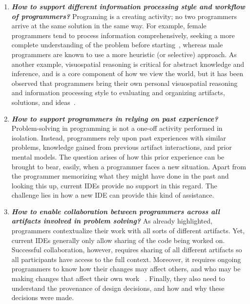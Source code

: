 \begin{enumerate}
 	\item \textit{\textbf{How to support different information processing style and workflow of programmers?}}
 	Programing is a creating activity; no two programmers arrive at the same solution in the same way. For example, female programmers tend to process information comprehensively, seeking a more complete understanding of the problem before starting~\cite{grigoreanu2012end}, whereas male programmers are known to use a more heuristic (or selective) approach. As another example, visuospatial reasoning is critical for abstract knowledge and inference, and is a core component of how we view the world, but it has been observed that programmers bring their own personal visuospatial reasoning and information processing style to evaluating and organizing artifacts, solutions, and ideas~\cite{tversky2005visuospatial}.
  
  \item \textit{\textbf{How to support programmers in relying on past experience?}}
  Problem-solving in programming is not a one-off activity performed in isolation.
  Instead, programmers rely upon past experiences with similar problems, knowledge gained from previous artifact interactions, and prior mental models. %
  The question arises of how this prior experience can be brought to bear, easily, when a programmer faces a new situation. Apart from the programmer memorizing what they might have done in the past and looking this up, current IDEs provide no support in this regard. The challenge lies in how a new IDE can provide this kind of assistance.
  
  \item \textit{\textbf{How to enable collaboration between programmers across all artifacts involved in problem solving?}}
As already highlighted, programmers contextualize their work with all sorts of different artifacts. Yet, current IDEs generally only allow sharing of the code being worked on. Successful collaboration, however, requires sharing of all different artifacts so all participants have access to the full context. Moreover, it requires ongoing programmers to  know how their changes may affect others, and who may be making changes that affect their own work ~\cite{desouza2008empirical}. Finally, they also need to understand the provenance of design decisions, and how and why these decisions were made. 


\end{enumerate}
